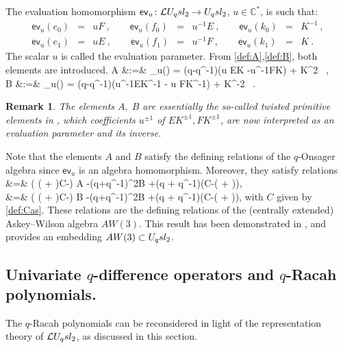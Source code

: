 \documentclass[11pt]{amsart}
\numberwithin{equation}{section}
\newtheorem{rem}[thm]{Remark}
\numberwithin{equation}{section}
\begin{document}
 The evaluation homomorphism $\mathsf{ev}_u \colon \mathcal{L} U_q sl_2 \rightarrow U_q sl_2$, $u\in {\mathbb C}^*$, is such that: 
	\begin{equation}\label{map:eval}
		\begin{matrix}
			\mathsf{ev}_u(e_0)&=& uF\ , \qquad  \mathsf{ev}_u(f_0)&=&u^{-1}E\ , \qquad \mathsf{ev}_u(k_0)&=&K^{-1} \ , \\ 
			\mathsf{ev}_u(e_1)&=&uE\ , \qquad  \mathsf{ev}_u(f_1)&=&u^{-1}F\ , \qquad \mathsf{ev}_u(k_1)&=& K\ .
		\end{matrix}
	\end{equation}
The scalar $u$ is called the evaluation parameter.    
From \eqref{def:A},\eqref{def:B}, both elements are introduced.
	\beqa
	A &:=& _u() = (q-q^{-1})(u EK -u^{-1}FK) + \alpha K^2 \ ,\label{eq:w0u}\\
	B &:=& _u() =  (q-q^{-1})(u^{-1}EK^{-1} - u FK^{-1}) + \beta K^{-2} \ .\label{eq:w1u}
	\eeqa
\begin{rem}
The elements $A,\;B$ are essentially the so-called twisted primitive elements in \cite{Koor}, which coefficients $u^{\pm 1}$ of $EK^{\pm 1},FK^{\pm 1}$, are now interpreted as an evaluation parameter and its inverse.
\end{rem}

Note that the elements $A$ and $B$ satisfy the defining relations of the $q$-Onsager algebra since $\mathsf{ev}_u$ is an algebra homomorphism. Moreover, they satisfy relations 
\beqa
 \qquad{}&=&
 \left(
 \left( + \right)C-\alpha\beta\right) A
 -(q+q^{-1})^2B
+(q + q^{-1})\left(\beta C-\alpha\left( + \right)\right),\label{eq:AW1} \\
  &=&
 \left(
 \left( + \right)C-\alpha\beta\right) B
 -(q+q^{-1})^2B
+(q + q^{-1})\left(\alpha C-\beta\left( + \right)\right),\label{eq:AW2}
\eeqa
with $C$ given by \eqref{def:Cas}.
These relations are the defining relations of the (centrally extended) Askey--Wilson algebra $AW(3)$. 
This result has been demonstrated in \cite{GZ93}, and provides an embedding $AW(3)\subset U_q sl_2$.


\subsection{Univariate $q$-difference operators and $q$-Racah polynomials.}\label{sec:qdiff} 
The $q$-Racah polynomials can be reconsidered in light of the representation theory of $\mathcal{L} U_q sl_2$, as discussed in this section.
\end{document}
